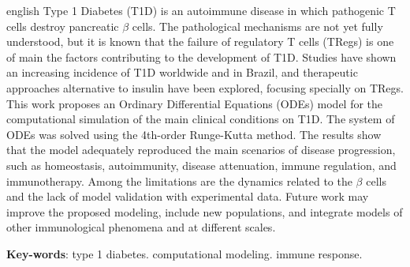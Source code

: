 \begin{resumo}[Abstract]
	\begin{otherlanguage*}{english}
		Type 1 Diabetes (T1D) is an autoimmune disease in which pathogenic T cells destroy pancreatic $\beta$ cells. The pathological mechanisms are not yet fully understood, but it is known that the failure of regulatory T cells (TRegs) is one of main the factors contributing to the development of T1D. Studies have shown an increasing incidence of T1D worldwide and in Brazil, and therapeutic approaches alternative to insulin have been explored, focusing specially on TRegs. This work proposes an Ordinary Differential Equations (ODEs) model for the computational simulation of the main clinical conditions on T1D. The system of ODEs was solved using the 4th-order Runge-Kutta method. The results show that the model adequately reproduced the main scenarios of disease progression, such as homeostasis, autoimmunity, disease attenuation, immune regulation, and immunotherapy. Among the limitations are the dynamics related to the $\beta$ cells  and the lack of model validation with experimental data. Future work may improve the proposed modeling, include new populations, and integrate models of other immunological phenomena and at  different scales.
		
		\vspace{\onelineskip}
		
		\noindent 
		\textbf{Key-words}: type 1 diabetes. computational modeling. immune response.
	\end{otherlanguage*}
\end{resumo}